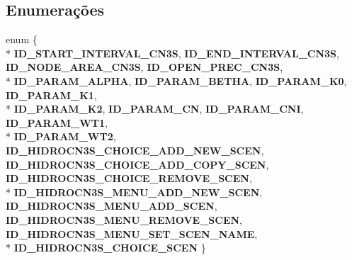 \subsection*{Enumerações}
\begin{DoxyCompactItemize}
\item 
enum \{ \\*
{\bf I\+D\+\_\+\+S\+T\+A\+R\+T\+\_\+\+I\+N\+T\+E\+R\+V\+A\+L\+\_\+\+C\+N3S}, 
{\bf I\+D\+\_\+\+E\+N\+D\+\_\+\+I\+N\+T\+E\+R\+V\+A\+L\+\_\+\+C\+N3S}, 
{\bf I\+D\+\_\+\+N\+O\+D\+E\+\_\+\+A\+R\+E\+A\+\_\+\+C\+N3S}, 
{\bf I\+D\+\_\+\+O\+P\+E\+N\+\_\+\+P\+R\+E\+C\+\_\+\+C\+N3S}, 
\\*
{\bf I\+D\+\_\+\+P\+A\+R\+A\+M\+\_\+\+A\+L\+P\+HA}, 
{\bf I\+D\+\_\+\+P\+A\+R\+A\+M\+\_\+\+B\+E\+T\+HA}, 
{\bf I\+D\+\_\+\+P\+A\+R\+A\+M\+\_\+\+K0}, 
{\bf I\+D\+\_\+\+P\+A\+R\+A\+M\+\_\+\+K1}, 
\\*
{\bf I\+D\+\_\+\+P\+A\+R\+A\+M\+\_\+\+K2}, 
{\bf I\+D\+\_\+\+P\+A\+R\+A\+M\+\_\+\+CN}, 
{\bf I\+D\+\_\+\+P\+A\+R\+A\+M\+\_\+\+C\+NI}, 
{\bf I\+D\+\_\+\+P\+A\+R\+A\+M\+\_\+\+W\+T1}, 
\\*
{\bf I\+D\+\_\+\+P\+A\+R\+A\+M\+\_\+\+W\+T2}, 
{\bf I\+D\+\_\+\+H\+I\+D\+R\+O\+C\+N3\+S\+\_\+\+C\+H\+O\+I\+C\+E\+\_\+\+A\+D\+D\+\_\+\+N\+E\+W\+\_\+\+S\+C\+EN}, 
{\bf I\+D\+\_\+\+H\+I\+D\+R\+O\+C\+N3\+S\+\_\+\+C\+H\+O\+I\+C\+E\+\_\+\+A\+D\+D\+\_\+\+C\+O\+P\+Y\+\_\+\+S\+C\+EN}, 
{\bf I\+D\+\_\+\+H\+I\+D\+R\+O\+C\+N3\+S\+\_\+\+C\+H\+O\+I\+C\+E\+\_\+\+R\+E\+M\+O\+V\+E\+\_\+\+S\+C\+EN}, 
\\*
{\bf I\+D\+\_\+\+H\+I\+D\+R\+O\+C\+N3\+S\+\_\+\+M\+E\+N\+U\+\_\+\+A\+D\+D\+\_\+\+N\+E\+W\+\_\+\+S\+C\+EN}, 
{\bf I\+D\+\_\+\+H\+I\+D\+R\+O\+C\+N3\+S\+\_\+\+M\+E\+N\+U\+\_\+\+A\+D\+D\+\_\+\+S\+C\+EN}, 
{\bf I\+D\+\_\+\+H\+I\+D\+R\+O\+C\+N3\+S\+\_\+\+M\+E\+N\+U\+\_\+\+R\+E\+M\+O\+V\+E\+\_\+\+S\+C\+EN}, 
{\bf I\+D\+\_\+\+H\+I\+D\+R\+O\+C\+N3\+S\+\_\+\+M\+E\+N\+U\+\_\+\+S\+E\+T\+\_\+\+S\+C\+E\+N\+\_\+\+N\+A\+ME}, 
\\*
{\bf I\+D\+\_\+\+H\+I\+D\+R\+O\+C\+N3\+S\+\_\+\+C\+H\+O\+I\+C\+E\+\_\+\+S\+C\+EN}
 \}
\end{DoxyCompactItemize}
